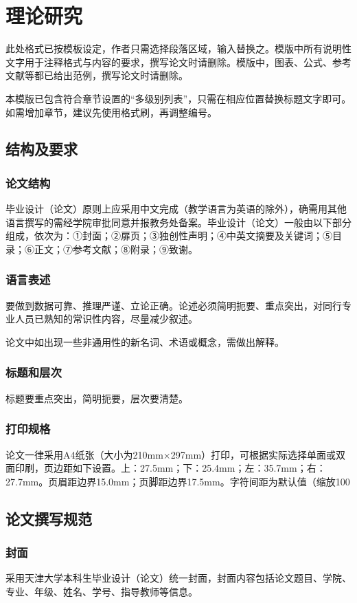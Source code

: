 \chapter{理论研究}
此处格式已按模板设定，作者只需选择段落区域，输入替换之。模版中所有说明性文字用于注释格式与内容的要求，撰写论文时请删除。模版中，图表、公式、参考文献等都已给出范例，撰写论文时请删除。

本模版已包含符合章节设置的“多级别列表”，只需在相应位置替换标题文字即可。如需增加章节，建议先使用格式刷，再调整编号。

\section{结构及要求}
\subsection{论文结构}
毕业设计（论文）原则上应采用中文完成（教学语言为英语的除外），确需用其他语言撰写的需经学院审批同意并报教务处备案。毕业设计（论文）一般由以下部分组成，依次为：①封面；②扉页；③独创性声明；④中英文摘要及关键词；⑤目录；⑥正文；⑦参考文献；⑧附录；⑨致谢。

\subsection{语言表述}
要做到数据可靠、推理严谨、立论正确。论述必须简明扼要、重点突出，对同行专业人员已熟知的常识性内容，尽量减少叙述。

论文中如出现一些非通用性的新名词、术语或概念，需做出解释。

\subsection{标题和层次}
标题要重点突出，简明扼要，层次要清楚。

\subsection{打印规格}
论文一律采用A4纸张（大小为210mm×297mm）打印，可根据实际选择单面或双面印刷，页边距如下设置。上：27.5mm；下：25.4mm；左：35.7mm；右：27.7mm。页眉距边界15.0mm；页脚距边界17.5mm。字符间距为默认值（缩放100%

\section{论文撰写规范}

\subsection{封面}
采用天津大学本科生毕业设计（论文）统一封面，封面内容包括论文题目、学院、专业、年级、姓名、学号、指导教师等信息。


